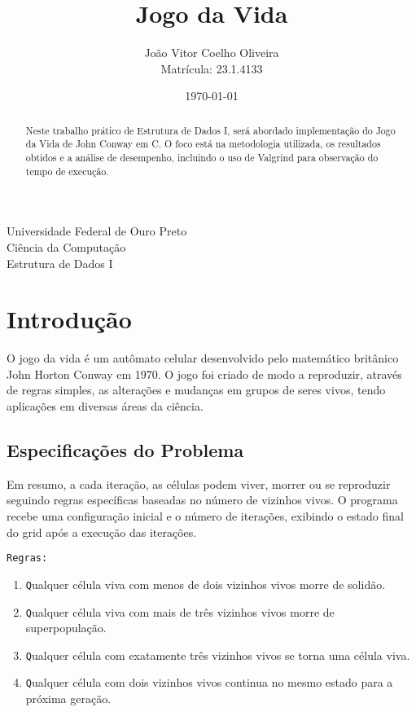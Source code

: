 \documentclass[a4paper,12pt]{article}
\title{Jogo da Vida}
\author{João Vitor Coelho Oliveira \\ Matrícula: 23.1.4133}
\date{\today}
\begin{document}
\maketitle

\begin{center}
    Universidade Federal de Ouro Preto\\
    Ciência da Computação\\
    Estrutura de Dados I
\end{center}

\begin{abstract}
    Neste trabalho prático de Estrutura de Dados I, será abordado implementação do Jogo da Vida de John Conway em C. O foco está na metodologia utilizada, os resultados obtidos e a análise de desempenho, incluindo o uso de Valgrind para observação do tempo de execução. 
\end{abstract}

\section{Introdução}
O jogo da vida é um autômato celular desenvolvido pelo matemático britânico John Horton Conway em 1970. O jogo foi criado de modo a reproduzir, através de regras simples, as alterações e mudanças em grupos de seres vivos, tendo aplicações em diversas áreas da ciência. 

\subsection{Especificações do Problema}
Em resumo, a cada iteração, as células podem viver, morrer ou se reproduzir seguindo regras específicas baseadas no número de vizinhos vivos. O programa recebe uma configuração inicial e o número de iterações, exibindo o estado final do grid após a execução das iterações.
\begin{verbatim}
Regras:    
\end{verbatim}

\begin{enumerate}
    \item \texttt Qualquer célula viva com menos de dois vizinhos vivos morre de solidão.
    \item \texttt Qualquer célula viva com mais de três vizinhos vivos morre de superpopulação.
    \item \texttt Qualquer célula com exatamente três vizinhos vivos se torna uma célula viva.
    \item \texttt Qualquer célula com dois vizinhos vivos continua no mesmo estado para a próxima geração.
\end{enumerate}
\end{document}
